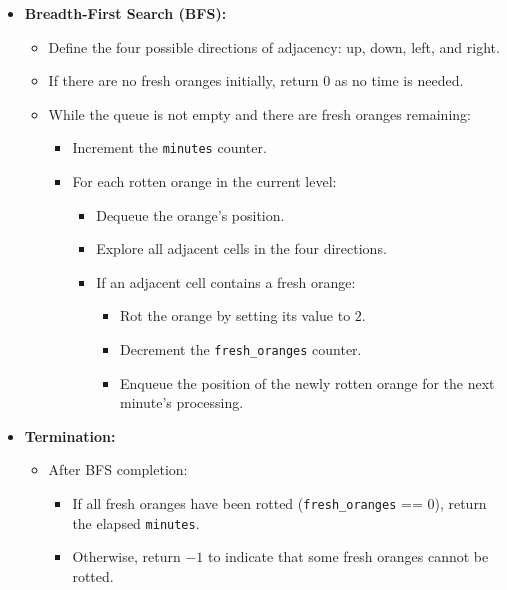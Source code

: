 \begin{itemize}
    \item \textbf{Breadth-First Search (BFS):}
    \begin{itemize}
        \item Define the four possible directions of adjacency: up, down, left, and right.
        \item If there are no fresh oranges initially, return \(0\) as no time is needed.
        \item While the queue is not empty and there are fresh oranges remaining:
        \begin{itemize}
            \item Increment the \texttt{minutes} counter.
            \item For each rotten orange in the current level:
            \begin{itemize}
                \item Dequeue the orange's position.
                \item Explore all adjacent cells in the four directions.
                \item If an adjacent cell contains a fresh orange:
                \begin{itemize}
                    \item Rot the orange by setting its value to \(2\).
                    \item Decrement the \texttt{fresh\_oranges} counter.
                    \item Enqueue the position of the newly rotten orange for the next minute's processing.
                \end{itemize}
            \end{itemize}
        \end{itemize}
    \end{itemize}
    
    \item \textbf{Termination:}
    \begin{itemize}
        \item After BFS completion:
        \begin{itemize}
            \item If all fresh oranges have been rotted (\texttt{fresh\_oranges} == \(0\)), return the elapsed \texttt{minutes}.
            \item Otherwise, return \(-1\) to indicate that some fresh oranges cannot be rotted.
        \end{itemize}
    \end{itemize}
\end{itemize}

